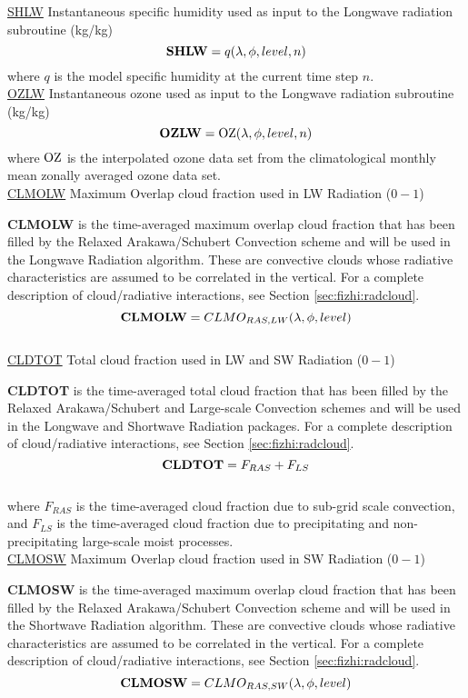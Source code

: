  
\noindent
{ \underline {SHLW} Instantaneous specific humidity used as input to
 the Longwave radiation subroutine (kg/kg)}
\[
{\bf SHLW}  = q(\lambda , \phi , level , n)
\]
\noindent
where $q$ is the model specific humidity at the current time step $n$.
\\
 
 
\noindent
{ \underline {OZLW} Instantaneous ozone used as input to
 the Longwave radiation subroutine (kg/kg)}
\[
{\bf OZLW}  = {\rm OZ}(\lambda , \phi , level , n)
\]
\noindent
where $\rm OZ$ is the interpolated ozone data set from the climatological monthly
mean zonally averaged ozone data set.
\\
 

\noindent
{ \underline {CLMOLW} Maximum Overlap cloud fraction used in LW Radiation ($0-1$) }

\noindent
{\bf CLMOLW} is the time-averaged maximum overlap cloud fraction that has been filled by the Relaxed
Arakawa/Schubert Convection scheme and will be used in the Longwave Radiation algorithm.  These are
convective clouds whose radiative characteristics are assumed to be correlated in the vertical.
For a complete description of cloud/radiative interactions, see Section \ref{sec:fizhi:radcloud}.
\[
{\bf CLMOLW} = CLMO_{RAS,LW}(\lambda, \phi,  level )
\]
\\
 

{ \underline {CLDTOT} Total cloud fraction used in LW and SW Radiation ($0-1$) }

{\bf CLDTOT} is the time-averaged total cloud fraction that has been filled by the Relaxed
Arakawa/Schubert and Large-scale Convection schemes and will be used in the Longwave and Shortwave
Radiation packages.
For a complete description of cloud/radiative interactions, see Section \ref{sec:fizhi:radcloud}.
\[
{\bf CLDTOT} = F_{RAS} + F_{LS}
\]
\\
where $F_{RAS}$ is the time-averaged cloud fraction due to sub-grid scale convection, and $F_{LS}$ is the
time-averaged cloud fraction due to precipitating and non-precipitating large-scale moist processes.
\\


\noindent
{ \underline {CLMOSW} Maximum Overlap cloud fraction used in SW Radiation ($0-1$) }

\noindent
{\bf CLMOSW} is the time-averaged maximum overlap cloud fraction that has been filled by the Relaxed
Arakawa/Schubert Convection scheme and will be used in the Shortwave Radiation algorithm.  These are
convective clouds whose radiative characteristics are assumed to be correlated in the vertical.
For a complete description of cloud/radiative interactions, see Section \ref{sec:fizhi:radcloud}.
\[
{\bf CLMOSW} = CLMO_{RAS,SW}(\lambda, \phi,  level )
\]
\\

